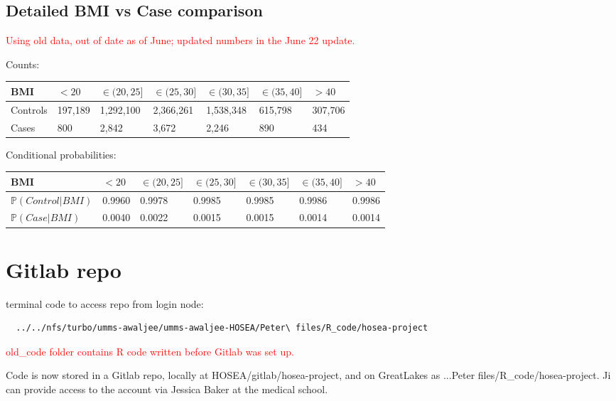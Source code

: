 \documentclass[12pt]{article}
\newcommand{\note}[1]{\textcolor{red}{#1}}
\begin{document}
\subsection*{Detailed BMI vs Case comparison}

\note{Using old data, out of date as of June; updated numbers in the June 22 update.}

Counts:
\begin{center}
\begin{tabular}{|l|l|l|l|l|l|l|}
\hline
 \textbf{BMI} & $< 20$ & $\in (20,25]$ & $\in (25,30]$ & $\in (30,35]$ & $\in (35,40]$ & $> 40$  \\ \hline
Controls & 197,189 & 1,292,100 & 2,366,261 & 1,538,348 & 615,798 & 307,706 \\ \hline
Cases & 800 & 2,842 & 3,672 & 2,246 & 890 & 434 \\ \hline
\end{tabular}
\end{center}

Conditional probabilities:
\begin{center}
\begin{tabular}{|l|l|l|l|l|l|l|}
\hline
 \textbf{BMI} & $< 20$ & $\in (20,25]$ & $\in (25,30]$ & $\in (30,35]$ & $\in (35,40]$ & $> 40$  \\ \hline
$\mathbb{P}(Control | BMI)$ & 0.9960 & 0.9978 & 0.9985 & 0.9985 & 0.9986 & 0.9986 \\ \hline
$\mathbb{P}(Case | BMI)$ & 0.0040 & 0.0022 & 0.0015 & 0.0015 & 0.0014 & 0.0014 \\ \hline
\end{tabular}
\end{center}

\section*{Gitlab repo}

terminal code to access repo from login node:

\begin{verbatim}
  ../../nfs/turbo/umms-awaljee/umms-awaljee-HOSEA/Peter\ files/R_code/hosea-project
\end{verbatim}

\note{old\_code folder contains R code written before Gitlab was set up.}

Code is now stored in a Gitlab repo, locally at HOSEA/gitlab/hosea-project, and on GreatLakes as ...Peter files/R\_code/hosea-project. Ji can provide access to the account via Jessica Baker at the medical school.
\end{document}
